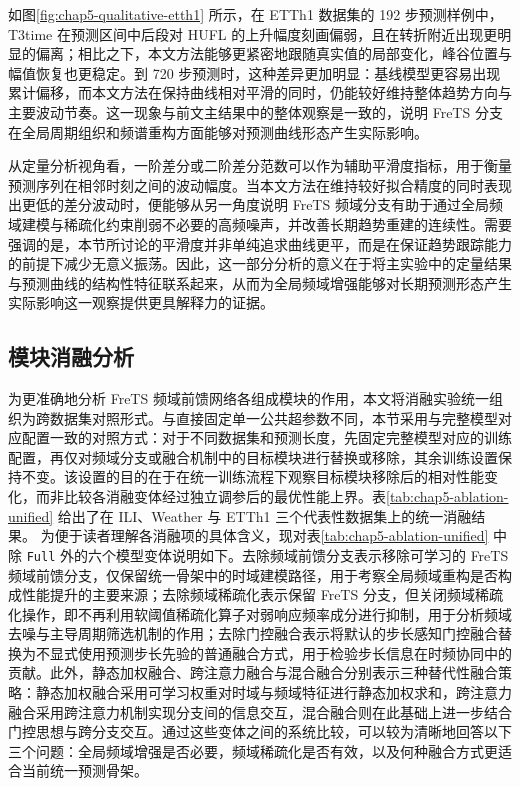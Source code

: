 如图\ref{fig:chap5-qualitative-etth1} 所示，在 ETTh1 数据集的 192 步预测样例中，T3time 在预测区间中后段对 HUFL 的上升幅度刻画偏弱，且在转折附近出现更明显的偏离；相比之下，本文方法能够更紧密地跟随真实值的局部变化，峰谷位置与幅值恢复也更稳定。到 720 步预测时，这种差异更加明显：基线模型更容易出现累计偏移，而本文方法在保持曲线相对平滑的同时，仍能较好维持整体趋势方向与主要波动节奏。这一现象与前文主结果中的整体观察是一致的，说明 FreTS 分支在全局周期组织和频谱重构方面能够对预测曲线形态产生实际影响。

从定量分析视角看，一阶差分或二阶差分范数可以作为辅助平滑度指标，用于衡量预测序列在相邻时刻之间的波动幅度。当本文方法在维持较好拟合精度的同时表现出更低的差分波动时，便能够从另一角度说明 FreTS 频域分支有助于通过全局频域建模与稀疏化约束削弱不必要的高频噪声，并改善长期趋势重建的连续性。需要强调的是，本节所讨论的平滑度并非单纯追求曲线更平，而是在保证趋势跟踪能力的前提下减少无意义振荡。因此，这一部分分析的意义在于将主实验中的定量结果与预测曲线的结构性特征联系起来，从而为全局频域增强能够对长期预测形态产生实际影响这一观察提供更具解释力的证据。

\subsection{模块消融分析}
为更准确地分析 FreTS 频域前馈网络各组成模块的作用，本文将消融实验统一组织为跨数据集对照形式。与直接固定单一公共超参数不同，本节采用与完整模型对应配置一致的对照方式：对于不同数据集和预测长度，先固定完整模型对应的训练配置，再仅对频域分支或融合机制中的目标模块进行替换或移除，其余训练设置保持不变。该设置的目的在于在统一训练流程下观察目标模块移除后的相对性能变化，而非比较各消融变体经过独立调参后的最优性能上界。表\ref{tab:chap5-ablation-unified} 给出了在 ILI、Weather 与 ETTh1 三个代表性数据集上的统一消融结果。 为便于读者理解各消融项的具体含义，现对表\ref{tab:chap5-ablation-unified} 中除 \texttt{Full} 外的六个模型变体说明如下。去除频域前馈分支表示移除可学习的 FreTS 频域前馈分支，仅保留统一骨架中的时域建模路径，用于考察全局频域重构是否构成性能提升的主要来源；去除频域稀疏化表示保留 FreTS 分支，但关闭频域稀疏化操作，即不再利用软阈值稀疏化算子对弱响应频率成分进行抑制，用于分析频域去噪与主导周期筛选机制的作用；去除门控融合表示将默认的步长感知门控融合替换为不显式使用预测步长先验的普通融合方式，用于检验步长信息在时频协同中的贡献。此外，静态加权融合、跨注意力融合与混合融合分别表示三种替代性融合策略：静态加权融合采用可学习权重对时域与频域特征进行静态加权求和，跨注意力融合采用跨注意力机制实现分支间的信息交互，混合融合则在此基础上进一步结合门控思想与跨分支交互。通过这些变体之间的系统比较，可以较为清晰地回答以下三个问题：全局频域增强是否必要，频域稀疏化是否有效，以及何种融合方式更适合当前统一预测骨架。

